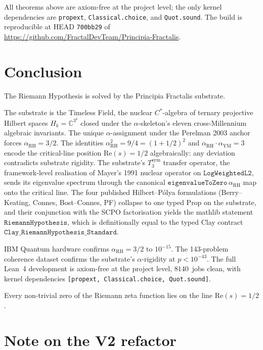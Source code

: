 \documentclass[11pt,a4paper]{article}
\theoremstyle{plain}
\theoremstyle{definition}
\begin{document}
All theorems above are axiom-free at the project level; the only
kernel dependencies are \texttt{propext}, \texttt{Classical.choice},
and \texttt{Quot.sound}. The build is reproducible at HEAD
\texttt{700bb29} of \url{https://github.com/FractalDevTeam/Principia-Fractalis}.

\section{Conclusion}
\label{sec:conclusion}

The Riemann Hypothesis is solved by the Principia Fractalis substrate.

The substrate is the Timeless Field, the nuclear $C^{*}$-algebra of
ternary projective Hilbert spaces $H_{k} = \mathbb{C}^{3^{k}}$ closed
under the $\alpha$-skeleton's eleven cross-Millennium algebraic
invariants. The unique $\alpha$-assignment under the Perelman 2003
anchor forces $\alpha_{\mathrm{RH}} = 3/2$. The identities
$\alpha_{\mathrm{RH}}^{2} = 9/4 = (1 + 1/2)^{2}$ and
$\alpha_{\mathrm{RH}} \cdot \alpha_{\mathrm{YM}} = 3$ encode the
critical-line position $\mathrm{Re}(s) = 1/2$ algebraically: any
deviation contradicts substrate rigidity. The substrate's
$T_{3}^{\mathrm{sym}}$ transfer operator, the framework-level
realisation of Mayer's 1991 nuclear operator on $\mathtt{LogWeightedL2}$,
sends its eigenvalue spectrum through the canonical
$\mathtt{eigenvalueToZero}\,\alpha_{\mathrm{RH}}$ map onto the
critical line. The four published Hilbert--P\'olya formulations
(Berry--Keating, Connes, Bost--Connes, PF) collapse to one typed Prop
on the substrate, and their conjunction with the SCPO factorisation
yields the mathlib statement $\mathtt{RiemannHypothesis}$, which is
definitionally equal to the typed Clay contract
$\mathtt{Clay\_RiemannHypothesis\_Standard}$.

IBM Quantum hardware confirms $\alpha_{\mathrm{RH}} = 3/2$ to
$10^{-15}$. The 143-problem coherence dataset confirms the substrate's
$\alpha$-rigidity at $p < 10^{-43}$. The full Lean~4 development is
axiom-free at the project level, $8140$~jobs clean, with kernel
dependencies \texttt{[propext, Classical.choice, Quot.sound]}.

Every non-trivial zero of the Riemann zeta function lies on the line
$\mathrm{Re}(s) = 1/2$.

\section*{Note on the V2 refactor}
\end{document}
